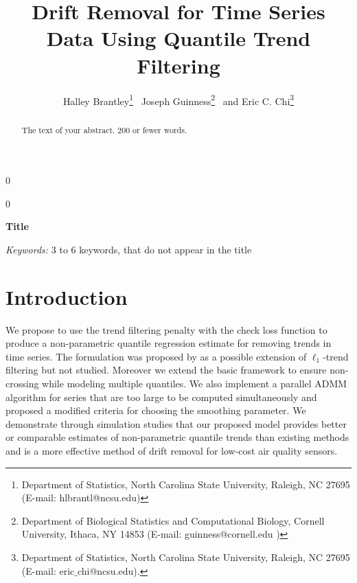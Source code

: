 \documentclass[12pt]{article}
\newcommand{\blind}{0}
\begin{document}
	
	
	\def\spacingset#1{\renewcommand{\baselinestretch}%
		{#1}\small\normalsize} \spacingset{1}
	
	
	
	\blind
	{
		\title{\bf Drift Removal for Time Series Data Using Quantile Trend Filtering}
		\author{Halley Brantley\thanks{
				Department of Statistics, North Carolina State University, Raleigh, NC 27695 (E-mail: hlbrantl@ncsu.edu)} \,
			Joseph Guinness\thanks{
				Department of Biological Statistics and Computational Biology, Cornell University, Ithaca, NY 14853 (E-mail: guinness@cornell.edu )} \,
			and
			Eric C. Chi\thanks{Department of Statistics, North Carolina State University, Raleigh, NC 27695 (E-mail: eric$\_$chi@ncsu.edu).}    \\}
		\date{}
		\maketitle
	} \fi
		
	\blind
	{
		\bigskip
		\bigskip
		\bigskip
		\begin{center}
			{\LARGE\bf Title}
		\end{center}
		\medskip
	} \fi
	
	\bigskip
	\begin{abstract}
		The text of your abstract.  200 or fewer words.
	\end{abstract}
	
	\noindent%
	{\it Keywords:}  3 to 6 keywords, that do not appear in the title
	\vfill
	
	\newpage
	\spacingset{1.5} %
	\section{Introduction}
	\label{sec:intro}
	
	We propose to use the trend filtering penalty with the check loss function to produce a non-parametric quantile regression estimate for removing trends in time series. The formulation was proposed by \cite{Kim2009} as a possible extension of $\ell_1$-trend filtering but not studied. Moreover we extend the basic framework to ensure non-crossing while modeling multiple quantiles. We also implement a parallel ADMM algorithm for series that are too large to be computed simultaneously and proposed a modified criteria for choosing the smoothing parameter. We demonstrate through simulation studies that our proposed model provides better or comparable estimates of non-parametric quantile trends than existing methods and is a more effective method of drift removal for low-cost air quality sensors. 
		
\end{document}
